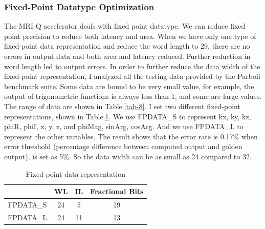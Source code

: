 \documentclass{sig-alternate}
\begin{document}
\subsubsection{Fixed-Point Datatype Optimization}
The MRI-Q accelerator deals with fixed point datatype. We can reduce fixed point precision to reduce both latency and area. When we have only one type of fixed-point data representation and reduce the word length to 29, there are no errors in output data and both area and latency reduced. Further reduction in word length led to output errors. In order to further reduce the data width of the fixed-point representation, I analyzed all the testing data provided by the Parboil benchmark suite. Some data are bound to be very small value, for example, the output of trigonometric functions is always less than 1, and some are large values. The range of data are shown in Table.\ref{tab-8}. I set two different fixed-point representations, shown in Table.\ref{tab-4}. We use FPDATA\_S to represent kx, ky, kz, phiR, phiI, x, y, z, and phiMag, sinArg, cosArg. And we use FPDATA\_L to represent the other variables. The result shows that the error rate is 0.17\% when error threshold (percentage difference between computed output and golden output), is set as 5\%. So the data width can be as small as 24 compared to 32. \\
\begin{table}[h!]
    \centering
    \begin{tabular}{c|c|c|c}
    \hline
        & WL & IL & Fractional Bits \\
        \hline
   FPDATA\_S &  24  & 5  & 19 \\ 
FPDATA\_L &  24 & 11   & 13\\
    \hline
    \end{tabular}
    \caption{Fixed-point data representation}
    \label{tab-4}
\end{table}
\end{document}
